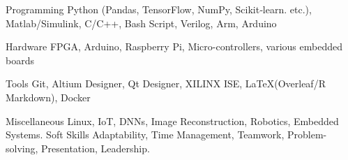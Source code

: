 

\begin{cvskills}

  \cvskill
    {Programming} %
    {Python (Pandas, TensorFlow, NumPy, Scikit‑learn. etc.), Matlab/Simulink, C/C++, Bash Script, Verilog, Arm, Arduino} %

  \cvskill
    {Hardware} %
    {FPGA, Arduino, Raspberry Pi, Micro-controllers, various embedded boards} %

  \cvskill
    {Tools} %
    {Git, Altium Designer, Qt Designer, XILINX ISE, \LaTeX (Overleaf/R Markdown), Docker} %
    
  \cvskill
    {Miscellaneous} %
    {Linux, IoT, DNNs, Image Reconstruction, Robotics, Embedded Systems.} %
  \cvskill
    {Soft Skills} %
    {Adaptability, Time Management, Teamwork, Problem-solving,  Presentation, Leadership.} %

\end{cvskills}
